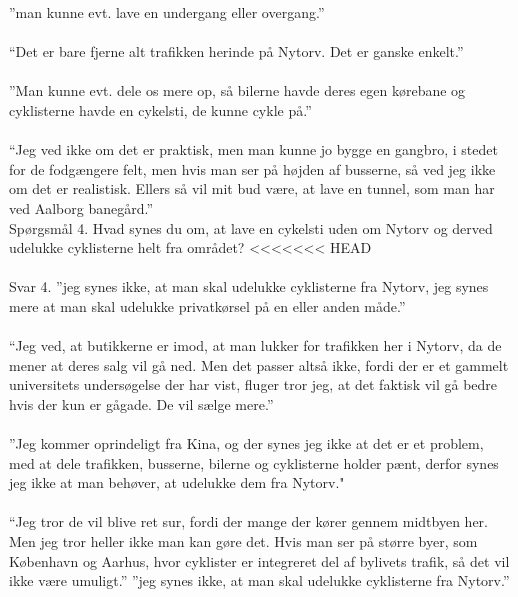\begin{appendics}
  ”man kunne evt. lave en undergang eller overgang.”
\\\\
  “Det er bare fjerne alt trafikken herinde på Nytorv. Det er ganske enkelt.”
\\\\
  ”Man kunne evt. dele os mere op, så bilerne havde deres egen kørebane og cyklisterne havde en cykelsti, de kunne cykle på.”
\\\\
  “Jeg ved ikke om det er praktisk, men man kunne jo bygge en gangbro, i stedet for de fodgængere felt, men hvis man ser på højden af busserne, så ved jeg ikke om det er realistisk. Ellers så vil mit bud være, at lave en tunnel, som man har ved Aalborg banegård.”
\\
Spørgsmål 4.
Hvad synes du om, at lave en cykelsti uden om Nytorv og derved udelukke cyklisterne helt fra området?
<<<<<<< HEAD
\\\\
  Svar 4.
  ”jeg synes ikke, at man skal udelukke cyklisterne fra Nytorv, jeg synes mere at man skal udelukke privatkørsel på en eller anden måde.”
\\\\
  “Jeg ved, at butikkerne er imod, at man lukker for trafikken her i Nytorv, da de mener at deres salg vil gå ned. Men det passer altså ikke, fordi der er et gammelt universitets undersøgelse der har vist, fluger tror jeg, at det faktisk vil gå bedre hvis der kun er gågade. De vil sælge mere.”
\\\\
  ”Jeg kommer oprindeligt fra Kina, og der synes jeg ikke at det er et problem, med at dele trafikken, busserne, bilerne og cyklisterne holder pænt, derfor synes jeg ikke at man behøver, at udelukke dem fra Nytorv."
\\\\
  “Jeg tror de vil blive ret sur, fordi der mange der kører gennem midtbyen her. Men jeg tror heller ikke man kan gøre det. Hvis man ser på større byer, som København og Aarhus, hvor cyklister er integreret del af bylivets trafik, så det vil ikke være umuligt.”
  ”jeg synes ikke, at man skal udelukke cyklisterne fra Nytorv.”
\\\\


\end{appendics}
